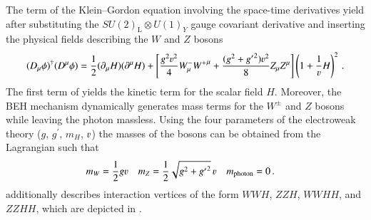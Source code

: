 The term of the Klein--Gordon equation involving the space-time derivatives
yield after substituting the $SU(2)_{\text{L}} \otimes U(1)_Y$ gauge covariant
derivative and inserting the physical fields describing the $W$ and $Z$ bosons
\begin{align}
  (D_\mu \phi)^\dagger (D^\mu \phi) =
  \frac{1}{2} (\partial_\mu H) (\partial^\mu H)
  + \left[
  \frac{g^2 \varv^2}{4} W^{-}_\mu {W^{+}}^\mu
  +
  \frac{(g^2 + {g^\prime}^2) \varv^2}{8} Z_\mu Z^\mu
  \right] \left( 1 + \frac{1}{\varv} H \right)^2 \,\text{.}
  \label{eq:higgs_covariant_derivative}
\end{align}
The first term of  yields the kinetic term
for the scalar field $H$. Moreover, the BEH mechanism dynamically generates mass
terms for the $W^\pm$ and $Z$ bosons while leaving the photon massless. Using
the four parameters of the electroweak theory ($g$, $g^\prime$, $m_{H}$, $\varv$)
the masses of the bosons can be obtained from the Lagrangian such that
\begin{align*}
  &m_W = \frac{1}{2} g \varv  &&m_Z = \frac{1}{2} \sqrt{g^2 + {g^\prime}^2} \, \varv && m_{\text{photon}} = 0 \,\text{.}
\end{align*}
 additionally describes interaction vertices
of the form $WWH$, $ZZH$, $WWHH$, and $ZZHH$, which are depicted in
.


